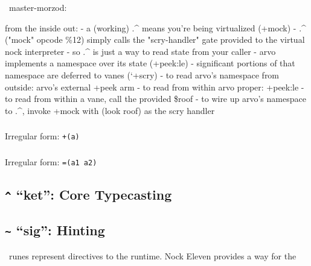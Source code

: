 ~master-morzod:

from the inside out:
- a (working) .^ means you're being virtualized (+mock)
- .^ ("mock" opcode \%12) simply calls the "scry-handler" gate provided to the virtual nock interpreter
- so .^ is just a way to read state from your caller
- arvo implements a namespace over its state (+peek:le)
- significant portions of that namespace are deferred to vanes (`+scry)
- to read arvo's namespace from outside: arvo's external +peek arm
- to read from within arvo proper: +peek:le
- to read from within a vane, call the provided \$roof
- to wire up arvo's namespace to .^, invoke +mock with (look roof) as the scry handler


\subsubsection{\pdotlus}

Irregular form:  \texttt{+(a)}

\subsubsection{\pdottar}

\subsubsection{\pdottis}

Irregular form:  \texttt{=(a1 a2)}

\subsubsection{\pdotwut}

\subsection{\texttt{\^} “ket”:  Core Typecasting}

\subsection{\texttt{\textasciitilde} “sig”:  Hinting}


\psig~runes represent directives to the runtime.  Nock Eleven provides a way for the


